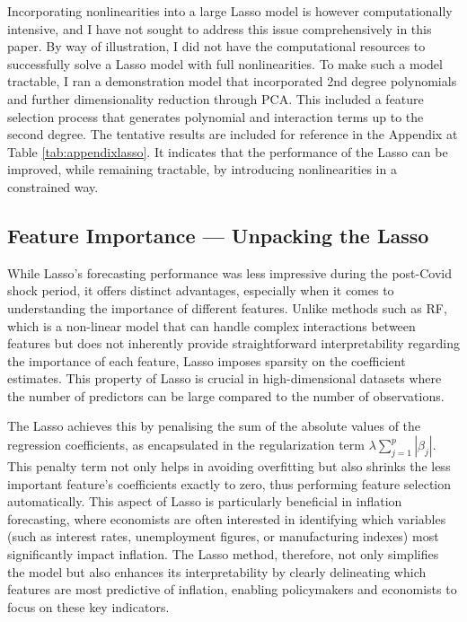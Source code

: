 Incorporating nonlinearities into a large Lasso model is however computationally intensive, and I have not sought to address this issue comprehensively in this paper. By way of illustration, I did not have the computational resources to successfully solve a Lasso model with full nonlinearities. To make such a model tractable, I ran a demonstration model that incorporated 2nd degree polynomials and further dimensionality reduction through PCA. This included a feature selection process that generates polynomial and interaction terms up to the second degree. The tentative results are included for reference in the Appendix at Table \ref{tab:appendixlasso}. It indicates that the performance of the Lasso can be improved, while remaining tractable, by introducing nonlinearities in a constrained way.

\subsection{Feature Importance — Unpacking the Lasso} \label{sec:analysis_lasso}

While Lasso's forecasting performance was less impressive during the post-Covid shock period, it offers distinct advantages, especially when it comes to understanding the importance of different features. Unlike methods such as RF, which is a non-linear model that can handle complex interactions between features but does not inherently provide straightforward interpretability regarding the importance of each feature, Lasso imposes sparsity on the coefficient estimates. This property of Lasso is crucial in high-dimensional datasets where the number of predictors can be large compared to the number of observations.

The Lasso achieves this by penalising the sum of the absolute values of the regression coefficients, as encapsulated in the regularization term $\lambda \sum_{j=1}^p |\beta_j|$. This penalty term not only helps in avoiding overfitting but also shrinks the less important feature's coefficients exactly to zero, thus performing feature selection automatically. This aspect of Lasso is particularly beneficial in inflation forecasting, where economists are often interested in identifying which variables (such as interest rates, unemployment figures, or manufacturing indexes) most significantly impact inflation. The Lasso method, therefore, not only simplifies the model but also enhances its interpretability by clearly delineating which features are most predictive of inflation, enabling policymakers and economists to focus on these key indicators.

